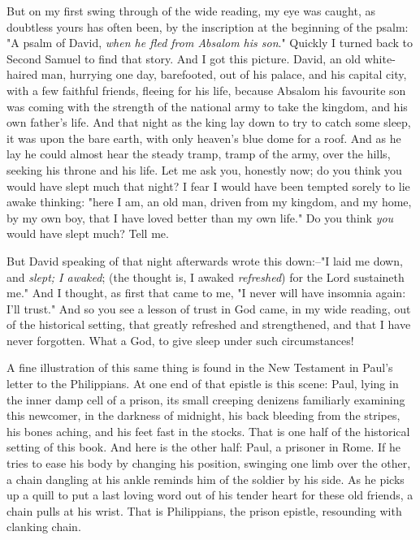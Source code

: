 But on my first swing through of the wide reading, my eye was caught, as
doubtless yours has often been, by the inscription at the beginning of the
psalm: "A psalm of David, \textit{when he fled from Absalom his son}." Quickly I
turned back to Second Samuel to find that story. And I got this picture.
David, an old white-haired man, hurrying one day, barefooted, out of his
palace, and his capital city, with a few faithful friends, fleeing for his
life, because Absalom his favourite son was coming with the strength of
the national army to take the kingdom, and his own father's life. And that
night as the king lay down to try to catch some sleep, it was upon the
bare earth, with only heaven's blue dome for a roof. And as he lay he
could almost hear the steady tramp, tramp of the army, over the hills,
seeking his throne and his life. Let me ask you, honestly now; do you
think you would have slept much that night? I fear I would have been
tempted sorely to lie awake thinking: "here I am, an old man, driven from
my kingdom, and my home, by my own boy, that I have loved better than my
own life." Do you think \textit{you} would have slept much? Tell me.

But David speaking of that night afterwards wrote this down:--"I laid me
down, and \textit{slept; I awaked}; (the thought is, I awaked \textit{refreshed}) for
the Lord sustaineth me." And I thought, as first that came to me, "I never
will have insomnia again: I'll trust." And so you see a lesson of trust in
God came, in my wide reading, out of the historical setting, that greatly
refreshed and strengthened, and that I have never forgotten. What a God,
to give sleep under such circumstances!

A fine illustration of this same thing is found in the New Testament in
Paul's letter to the Philippians. At one end of that epistle is this
scene: Paul, lying in the inner damp cell of a prison, its small creeping
denizens familiarly examining this newcomer, in the darkness of midnight,
his back bleeding from the stripes, his bones aching, and his feet fast in
the stocks. That is one half of the historical setting of this book. And
here is the other half: Paul, a prisoner in Rome. If he tries to ease his
body by changing his position, swinging one limb over the other, a chain
dangling at his ankle reminds him of the soldier by his side. As he picks
up a quill to put a last loving word out of his tender heart for these old
friends, a chain pulls at his wrist. That is Philippians, the prison
epistle, resounding with clanking chain.


